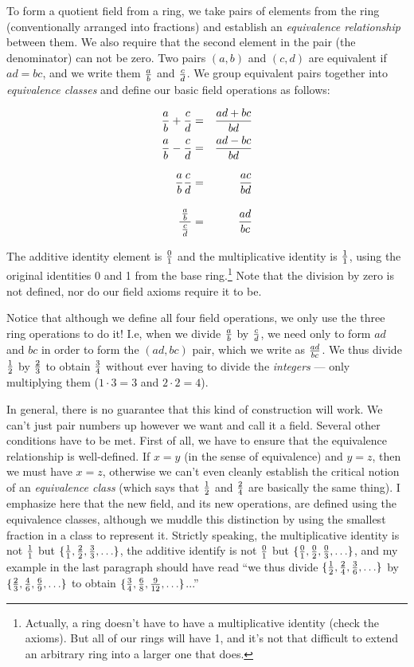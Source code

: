 To form a quotient field from a ring, we take pairs of elements from
the ring (conventionally arranged into fractions) and establish an
{\it equivalence relationship} between them.  We also require that the
second element in the pair (the denominator) can not be zero.  Two
pairs $(a,b)$ and $(c,d)$ are equivalent if $ad=bc$, and we write them
$a\over b$ and $c\over d$.  We group equivalent pairs together into
{\it equivalence classes} and define our basic field operations as
follows:

\begin{center}
\begin{eqnarray*}
{a\over b} + {c\over d} &=& {{ad+bc}\over{bd}} \cr
{a\over b} - {c\over d} &=& {{ad-bc}\over{bd}} \cr
{a\over b} {c\over d} &=& {{ac}\over{bd}} \vbox to20pt{}\cr
{\,{a\over b}\, \over {c \over d}} &=& {{ad}\over{bc}} \vbox to24pt{}\cr
\end{eqnarray*}
\end{center}

The additive identity element is $0\over1$ and the multiplicative
identity is $1\over1$, using the original identities 0 and 1 from the
base ring.\footnote{Actually, a ring doesn't have to have a
multiplicative identity (check the axioms).  But all of
our rings will have 1, and it's not that difficult to extend
an arbitrary ring into a larger one that does.}
Note that the division by zero is not defined, nor do
our field axioms require it to be.

Notice that although we define all four field operations, we only
use the three ring operations to do it!  I.e, when we divide
$a\over b$ by $c\over d$, we need only to form $ad$ and $bc$
in order to form the $(ad,bc)$ pair, which we write as ${ad}\over{bc}$.
We thus divide $1\over2$ by $2\over3$ to obtain $3\over4$
without ever having to divide the {\it integers} ---
only multiplying them ($1\cdot3=3$ and $2\cdot2=4$).

In general, there is no guarantee that this kind of construction will
work.  We can't just pair numbers up however we want and call it a
field.  Several other conditions have to be met.  First of all, we
have to ensure that the equivalence relationship is well-defined.  If
$x=y$ (in the sense of equivalence) and $y=z$, then we must have
$x=z$, otherwise we can't even cleanly establish the critical notion
of an {\it equivalence class} (which says that $1\over2$ and $2\over4$
are basically the same thing).  I emphasize here that the new field,
and its new operations, are defined using the equivalence classes,
although we muddle this distinction by using the smallest fraction in
a class to represent it.  Strictly speaking, the multiplicative
identity is not ${1\over1}$ but
$\{{1\over1},{2\over2},{3\over3},\ldots\}$, the additive identify is
not ${0\over1}$ but $\{{0\over1},{0\over2},{0\over3},\ldots\}$, and my
example in the last paragraph should have read ``we thus divide
$\{{1\over2},{2\over4},{3\over6},\ldots\}$ by
$\{{2\over3},{4\over6},{6\over9},\ldots\}$ to obtain
$\{{3\over4},{6\over8},{9\over12},\ldots\}$...''

